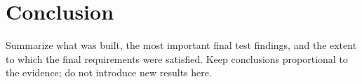 \chapter{Conclusion}
\label{sec:conclusion}

Summarize what was built, the most important final test findings, and the
extent to which the final requirements were satisfied. Keep conclusions
proportional to the evidence; do not introduce new results here.

